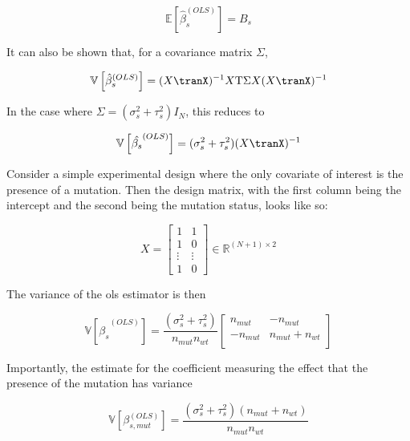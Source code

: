 \begin{equation}
  \mathbb{E} \left[ \hat{\beta}_s^{(OLS)} \right] = B_s
\end{equation}

It can also be shown that, for a covariance matrix $\Sigma$,

\begin{equation*}
  \mathbb{V} \left[ \hat{\beta}_s^{(OLS)} \right] = (X\tranX)^{-1} X\tran \Sigma X (X\tranX)^{-1}
\end{equation*}

In the case where $\Sigma = (\sigma_s^2 + \tau_s^2)I_N$, this reduces to

\begin{equation*}
  \mathbb{V} \left[ \hat{\beta_s}^{(OLS)} \right] = (\sigma_s^2 + \tau_s^2)(X\tranX)^{-1}
\end{equation*}

Consider a simple experimental design where the only covariate of interest is the presence of a mutation.
Then the design matrix, with the first column being the intercept and the second being the mutation status, looks like so:

\begin{equation*}
  X = \begin{bmatrix}
    1      & 1      \\
    1      & 0      \\
    \vdots & \vdots \\
    1      & 0
  \end{bmatrix}
  \in \mathbb{R}^{(N + 1) \times 2}
\end{equation*}

The variance of the \gls{ols} estimator is then

\begin{equation*}
  \mathbb{V} \left[ \hat{\beta_s}^{(OLS)} \right] = \frac{(\sigma_s^2 + \tau_s^2)}{n_{mut} n_{wt}}
  \begin{bmatrix}
    n_{mut}   & -n_{mut}         \\
    - n_{mut} & n_{mut} + n_{wt} \\
  \end{bmatrix}
\end{equation*}

Importantly, the estimate for the coefficient measuring the effect that the presence of the mutation has variance

\begin{equation*}
  \mathbb{V} \left[\beta_{s, mut}^{(OLS)} \right] = \frac{(\sigma_s^2 + \tau_s^2)(n_{mut} + n_{wt})}{n_{mut} n_{wt}}
\end{equation*}

